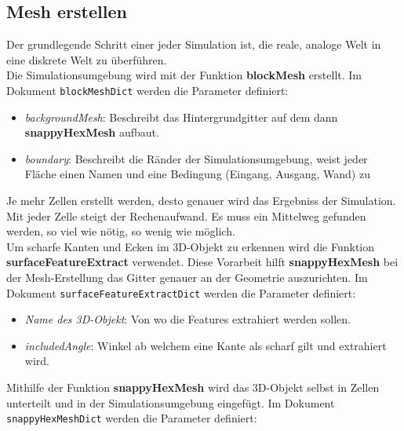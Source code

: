 \subsection{Mesh erstellen \label{openfoam:section:Mesh erstellen}}
Der grundlegende Schritt einer jeder Simulation ist, die reale, analoge Welt in eine diskrete Welt zu überführen.\\
Die Simulationsumgebung wird mit der Funktion \textbf{blockMesh} erstellt.
Im Dokument \texttt{blockMeshDict} werden die Parameter definiert:

\begin{itemize}
    \item \textit{backgroundMesh}: Beschreibt das Hintergrundgitter auf dem dann \textbf{snappyHexMesh} aufbaut.
    \item \textit{boundary}: Beschreibt die Ränder der Simulationsumgebung, weist jeder Fläche einen Namen und eine Bedingung (Eingang, Ausgang, Wand) zu
\end{itemize}

Je mehr Zellen erstellt werden, desto genauer wird das Ergebniss der Simulation.
Mit jeder Zelle steigt der Rechenaufwand.
Es muss ein Mittelweg gefunden werden, so viel wie nötig, so wenig wie möglich.\\

Um scharfe Kanten und Ecken im 3D-Objekt zu erkennen wird die Funktion \textbf{surfaceFeatureExtract} verwendet.
Diese Vorarbeit hilft \textbf{snappyHexMesh} bei der Mesh-Erstellung das Gitter genauer an der Geometrie auszurichten.
Im Dokument \texttt{surfaceFeatureExtractDict} werden die Parameter definiert:

\begin{itemize}
    \item \textit{Name des 3D-Objekt}: Von wo die Features extrahiert werden sollen.
    \item \textit{includedAngle}: Winkel ab welchem eine Kante als scharf gilt und extrahiert wird.
\end{itemize}

Mithilfe der Funktion \textbf{snappyHexMesh} wird das 3D-Objekt selbst in  Zellen unterteilt und in der Simulationsumgebung eingefügt. 
Im Dokument \texttt{snappyHexMeshDict} werden die Parameter definiert:

